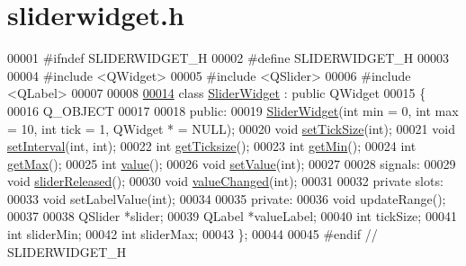 \hypertarget{sliderwidget_8h_source}{}\section{sliderwidget.\+h}
\label{sliderwidget_8h_source}

\begin{DoxyCode}
00001 \textcolor{preprocessor}{#ifndef SLIDERWIDGET\_H}
00002 \textcolor{preprocessor}{#define SLIDERWIDGET\_H}
00003 
00004 \textcolor{preprocessor}{#include <QWidget>}
00005 \textcolor{preprocessor}{#include <QSlider>}
00006 \textcolor{preprocessor}{#include <QLabel>}
00007 
00008 
\hypertarget{sliderwidget_8h_source.tex_l00014}{}\hyperlink{classSliderWidget}{00014} \textcolor{keyword}{class }\hyperlink{classSliderWidget}{SliderWidget} : \textcolor{keyword}{public} QWidget
00015 \{
00016     Q\_OBJECT
00017 
00018 \textcolor{keyword}{public}:
00019     \hyperlink{classSliderWidget_a22d7be7e513e8d74ec95fcc73d96fdf6}{SliderWidget}(\textcolor{keywordtype}{int} min = 0, \textcolor{keywordtype}{int} max = 10, \textcolor{keywordtype}{int} tick = 1, QWidget * = NULL);
00020     \textcolor{keywordtype}{void} \hyperlink{classSliderWidget_a8d5fb2c86d6dbcbe67ae480590020af6}{setTickSize}(\textcolor{keywordtype}{int});
00021     \textcolor{keywordtype}{void} \hyperlink{classSliderWidget_aeb088af9a4577c8ca1e64a06bd74eaa1}{setInterval}(\textcolor{keywordtype}{int}, \textcolor{keywordtype}{int});
00022     \textcolor{keywordtype}{int} \hyperlink{classSliderWidget_a3aec05c05cefab0ec470f6eb79afa81b}{getTicksize}();
00023     \textcolor{keywordtype}{int} \hyperlink{classSliderWidget_a6606e549b1e934517a48f68f9d29ffa6}{getMin}();
00024     \textcolor{keywordtype}{int} \hyperlink{classSliderWidget_acdeb4972b7a4ae90f0d042317ff2965d}{getMax}();
00025     \textcolor{keywordtype}{int} \hyperlink{classSliderWidget_a05ed61d5bb79a82da1f51f73b5e2466a}{value}();
00026     \textcolor{keywordtype}{void} \hyperlink{classSliderWidget_ad69dd98151b2132011341f7ae7799480}{setValue}(\textcolor{keywordtype}{int});
00027 
00028 signals:
00029     \textcolor{keywordtype}{void} \hyperlink{classSliderWidget_aa109c6305bc6e78efe3091982e787325}{sliderReleased}();
00030     \textcolor{keywordtype}{void} \hyperlink{classSliderWidget_a23048ce6bec593c2b4d932293b055fa7}{valueChanged}(\textcolor{keywordtype}{int});
00031 
00032 \textcolor{keyword}{private} slots:
00033     \textcolor{keywordtype}{void} setLabelValue(\textcolor{keywordtype}{int});
00034 
00035 \textcolor{keyword}{private}:
00036     \textcolor{keywordtype}{void} updateRange();
00037 
00038     QSlider *slider;
00039     QLabel *valueLabel;
00040     \textcolor{keywordtype}{int} tickSize;
00041     \textcolor{keywordtype}{int} sliderMin;
00042     \textcolor{keywordtype}{int} sliderMax;
00043 \};
00044 
00045 \textcolor{preprocessor}{#endif // SLIDERWIDGET\_H}
\end{DoxyCode}
